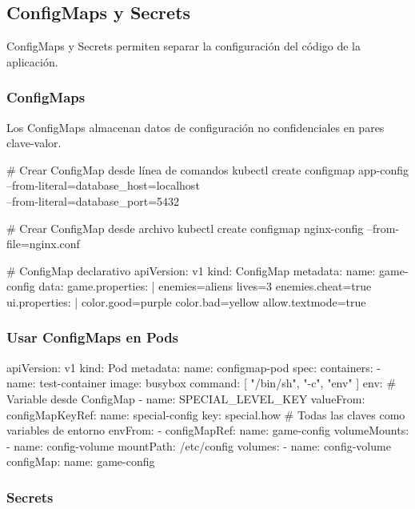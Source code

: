 \documentclass[11pt,a4paper]{article}
\begin{document}
\subsection{ConfigMaps y Secrets}

ConfigMaps y Secrets permiten separar la configuración del código de la aplicación.

\subsubsection{ConfigMaps}

Los ConfigMaps almacenan datos de configuración no confidenciales en pares clave-valor.

\begin{commandbox}
\# Crear ConfigMap desde línea de comandos
kubectl create configmap app-config \\
  --from-literal=database\_host=localhost \\
  --from-literal=database_port=5432

\# Crear ConfigMap desde archivo
kubectl create configmap nginx-config --from-file=nginx.conf

\# ConfigMap declarativo
apiVersion: v1
kind: ConfigMap
metadata:
  name: game-config
data:
  game.properties: |
    enemies=aliens
    lives=3
    enemies.cheat=true
  ui.properties: |
    color.good=purple
    color.bad=yellow
    allow.textmode=true
\end{commandbox}

\subsubsection{Usar ConfigMaps en Pods}

\begin{commandbox}
apiVersion: v1
kind: Pod
metadata:
  name: configmap-pod
spec:
  containers:
  - name: test-container
    image: busybox
    command: [ "/bin/sh", "-c", "env" ]
    env:
    # Variable desde ConfigMap
    - name: SPECIAL\_LEVEL\_KEY
      valueFrom:
        configMapKeyRef:
          name: special-config
          key: special.how
    # Todas las claves como variables de entorno
    envFrom:
    - configMapRef:
        name: game-config
    volumeMounts:
    - name: config-volume
      mountPath: /etc/config
  volumes:
  - name: config-volume
    configMap:
      name: game-config
\end{commandbox}

\subsubsection{Secrets}
\end{document}
